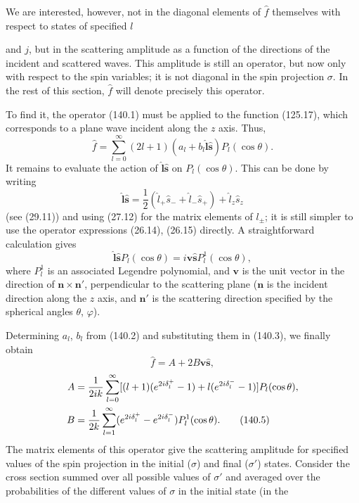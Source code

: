 We are interested, however, not in the diagonal elements of $\hat f$ themselves with respect to states of specified $l$

and $j$, but in the scattering amplitude as a function of the directions of the incident and scattered waves. This amplitude is still an operator, but now only with respect to the spin variables; it is not diagonal in the spin projection $\sigma$. In the rest of this section, $\hat f$ will denote precisely this operator.

To find it, the operator (140.1) must be applied to the function (125.17), which corresponds to a plane wave incident along the $z$ axis. Thus,
\begin{equation}\hat f=\sum_{l=0}^{\infty}(2l+1)(a_l+b_l\hat{\mathbf l}\hat{\mathbf s})P_l(\cos\theta).\tag{140.3}\end{equation}
It remains to evaluate the action of $\hat{\mathbf l}\hat{\mathbf s}$ on $P_l(\cos\theta)$. This can be done by writing
\[
 \hat{\mathbf l}\hat{\mathbf s}=\frac12(\hat l_+\hat s_-+\hat l_-\hat s_+)+\hat l_z\hat s_z
\]
(see (29.11)) and using (27.12) for the matrix elements of $l_\pm$; it is still simpler to use the operator expressions (26.14), (26.15) directly. A straightforward calculation gives
\[
 \hat{\mathbf l}\hat{\mathbf s}P_l(\cos\theta)=i\mathbf v\hat{\mathbf s}P_l^1(\cos\theta),
\]
where $P_l^1$ is an associated Legendre polynomial, and $\mathbf v$ is the unit vector in the direction of $\mathbf n\times\mathbf n'$, perpendicular to the scattering plane ($\mathbf n$ is the incident direction along the $z$ axis, and $\mathbf n'$ is the scattering direction specified by the spherical angles $\theta$, $\varphi$).

Determining $a_l$, $b_l$ from (140.2) and substituting them in (140.3), we finally obtain
\begin{equation}\hat f=A+2B\mathbf v\hat{\mathbf s},\tag{140.4}\end{equation}
\begin{align}
 A&=\frac1{2ik}\sum_{l=0}^{\infty}[(l+1)(e^{2i\delta_l^+}-1)+l(e^{2i\delta_l^-}-1)]P_l(\cos\theta),\notag\\
 B&=\frac1{2k}\sum_{l=1}^{\infty}(e^{2i\delta_l^+}-e^{2i\delta_l^-})P_l^1(\cos\theta).
 \tag{140.5}
\end{align}
The matrix elements of this operator give the scattering amplitude for specified values of the spin projection in the initial ($\sigma$) and final ($\sigma'$) states. Consider the cross section summed over all possible values of $\sigma'$ and averaged over the probabilities of the different values of $\sigma$ in the initial state (in the

